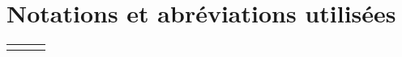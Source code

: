 \documentclass[10pt,letterpaper]{article}
\begin{document}
\TitlePAGE %
\renewcommand{\contentsname}{Table des matières}%
\hypertarget{ToC}{\tableofcontents}
\newpage

\setcounter{page}{1}
\section*{Notations et abréviations utilisées}
\begin{tabular}{clc}
 \hline \\
\end{tabular}
\newpage
\end{document}
